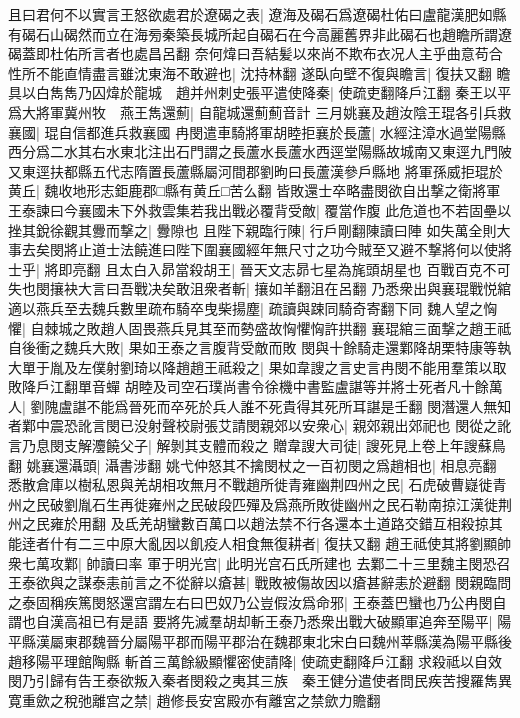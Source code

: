 且曰君何不以實言王怒欲處君於遼碣之表|{
	遼海及碣石爲遼碣杜佑曰盧龍漢肥如縣有碣石山碣然而立在海㫄秦築長城所起自碣石在今高麗舊界非此碣石也趙瞻所謂遼碣蓋即杜佑所言者也處昌呂翻}
奈何煒曰吾結髪以來尚不欺布衣况人主乎曲意苟合性所不能直情盡言雖沈東海不敢避也|{
	沈持林翻}
遂臥向壁不復與瞻言|{
	復扶又翻}
瞻具以白雋雋乃囚煒於龍城　趙并州刺史張平遣使降秦|{
	使疏吏翻降戶江翻}
秦王以平爲大將軍冀州牧　燕王雋還薊|{
	自龍城還薊薊音計}
三月姚襄及趙汝陰王琨各引兵救襄國|{
	琨自信都進兵救襄國}
冉閔遣車騎將軍胡睦拒襄於長蘆|{
	水經注漳水過堂陽縣西分爲二水其右水東北注出石門謂之長蘆水長蘆水西逕堂陽縣故城南又東逕九門陂又東逕扶都縣五代志隋置長蘆縣屬河間郡劉昫曰長蘆漢參戶縣地}
將軍孫威拒琨於黄丘|{
	魏收地形志鉅鹿郡□縣有黄丘□苦么翻}
皆敗還士卒略盡閔欲自出撃之衛將軍王泰諫曰今襄國未下外救雲集若我出戰必覆背受敵|{
	覆當作腹}
此危道也不若固壘以挫其銳徐觀其釁而撃之|{
	釁隙也}
且陛下親臨行陳|{
	行戶剛翻陳讀曰陣}
如失萬全則大事去矣閔將止道士法饒進曰陛下圍襄國經年無尺寸之功今賊至又避不撃將何以使將士乎|{
	將即亮翻}
且太白入昴當殺胡王|{
	晉天文志昴七星為旄頭胡星也}
百戰百克不可失也閔攘袂大言曰吾戰决矣敢沮衆者斬|{
	攘如羊翻沮在呂翻}
乃悉衆出與襄琨戰悦綰適以燕兵至去魏兵數里疏布騎卒曳柴揚塵|{
	疏讀與踈同騎奇寄翻下同}
魏人望之恟懼|{
	自棘城之敗趙人固畏燕兵見其至而勢盛故恟懼恟許拱翻}
襄琨綰三面撃之趙王祗自後衝之魏兵大敗|{
	果如王泰之言腹背受敵而敗}
閔與十餘騎走還鄴降胡栗特康等執大單于胤及左僕射劉琦以降趙趙王祗殺之|{
	果如韋謏之言史言冉閔不能用羣策以取敗降戶江翻單音蟬}
胡睦及司空石璞尚書令徐機中書監盧諶等并將士死者凡十餘萬人|{
	劉隗盧諶不能爲晉死而卒死於兵人誰不死貴得其死所耳諶是壬翻}
閔潛還人無知者鄴中震恐訛言閔已没射聲校尉張艾請閔親郊以安衆心|{
	親郊親出郊祀也}
閔從之訛言乃息閔支解灋饒父子|{
	解剝其支體而殺之}
贈韋謏大司徒|{
	謏死見上卷上年謏蘇鳥翻}
姚襄還灄頭|{
	灄書涉翻}
姚弋仲怒其不擒閔杖之一百初閔之爲趙相也|{
	相息亮翻}
悉散倉庫以樹私恩與羌胡相攻無月不戰趙所徙青雍幽荆四州之民|{
	石虎破曹嶷徙青州之民破劉胤石生再徙雍州之民破段匹殫及爲燕所敗徙幽州之民石勒南掠江漢徙荆州之民雍於用翻}
及氐羌胡蠻數百萬口以趙法禁不行各還本土道路交錯互相殺掠其能逹者什有二三中原大亂因以飢疫人相食無復耕者|{
	復扶又翻}
趙王祗使其將劉顯帥衆七萬攻鄴|{
	帥讀曰率}
軍于明光宫|{
	此明光宫石氏所建也}
去鄴二十三里魏主閔恐召王泰欲與之謀泰恚前言之不從辭以瘡甚|{
	戰敗被傷故因以瘡甚辭恚於避翻}
閔親臨問之泰固稱疾篤閔怒還宫謂左右曰巴奴乃公豈假汝爲命邪|{
	王泰蓋巴蠻也乃公冉閔自謂也自漢高祖已有是語}
要將先滅羣胡却斬王泰乃悉衆出戰大破顯軍追奔至陽平|{
	陽平縣漢屬東郡魏晉分屬陽平郡而陽平郡治在魏郡東北宋白曰魏州莘縣漢為陽平縣後趙移陽平理館陶縣}
斬首三萬餘級顯懼密使請降|{
	使疏吏翻降戶江翻}
求殺祗以自效閔乃引歸有告王泰欲叛入秦者閔殺之夷其三族　秦王健分遣使者問民疾苦搜羅雋異寛重歛之稅弛離宫之禁|{
	趙修長安宮殿亦有離宮之禁歛力贍翻}
